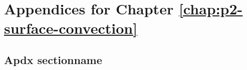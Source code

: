 \chapter{Appendices for Chapter \ref{chap:p2-surface-convection}}
\label{chap:apdx-p2}


\section{Apdx sectionname}
\lipsum[1-3]


